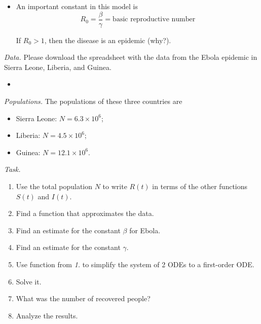 \begin{itemize}
\item An important constant in this model is 
$$
R_0 = \frac{\beta}{\gamma} = \text{basic reproductive number}
$$

If $R_0 > 1$, then the disease is an epidemic (why?).

\end{itemize}


\newpage

\emph{Data. } Please download the spreadsheet with the data from the Ebola epidemic in Sierra Leone, Liberia, and Guinea.
\begin{itemize}
	\item {}
\end{itemize}

\emph{Populations. } The populations of these three countries are
\begin{itemize}
\item Sierra Leone: $N=6.3 \times 10^6$;
\item Liberia: $N=4.5 \times 10^6$;
\item Guinea: $N=12.1 \times 10^6$.
\end{itemize}

\vfill

\emph{Task. } 

\begin{enumerate}[label=\emph{\arabic*.}]
\item Use the total population $N$ to write $R(t)$ in terms of the other functions $S(t)$ and $I(t)$.

\item Find a function that approximates the data.

\item Find an estimate for the constant $\beta$ for Ebola.

\item Find an estimate for the constant $\gamma$.

\item Use function from \emph{1.} to simplify the system of 2 ODEs to a first-order ODE.

\item Solve it.

\item What was the number of recovered people?

\item Analyze the results.
%
%

\end{enumerate}




